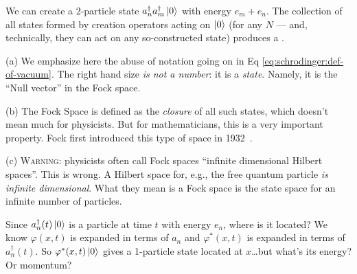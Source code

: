 \begin{definition}
We can create a 2-particle state
$a^{\dagger}_{n}a^{\dagger}_{m}\ket{0}$ with energy $e_{m}+e_{n}$. The
collection of all states formed by creation operators acting on
$\ket{0}$ (for any $N$ --- and, technically, they can act on any
so-constructed state) produces a .
\end{definition}

(a) We emphasize here the abuse of notation going on in Eq
\eqref{eq:schrodinger:def-of-vacuum}. The right hand size \emph{is not a
  number}: it is a \emph{state}. Namely, it is the ``Null vector'' in
the Fock space.

(b) The Fock Space is defined as the \emph{closure} of all such states,
which doesn't mean much for physicists. But for mathematicians, this is
a very important property. Fock first introduced this type of space in
1932~\cite{fock1932}. 

(c) \textsc{Warning:} physicists often call Fock spaces ``infinite
dimensional Hilbert spaces''. This is wrong. A Hilbert space for, e.g.,
the free quantum particle \emph{is infinite dimensional}. What they mean
is a Fock space is the state space for an infinite number of particles.

Since $a^{\dagger}_{n}(t)\ket{0}$ is a particle at time $t$ with
energy $e_{n}$, where is it located? We know $\varphi(x,t)$ is expanded
in terms of $a_{n}$ and $\varphi^{*}(x,t)$ is expanded in terms of
$a^{\dagger}_{n}(t)$. So $\varphi^{*}(x,t)\ket{0}$ gives a 1-particle
state located at $x$\dots but what's its energy? Or momentum?

